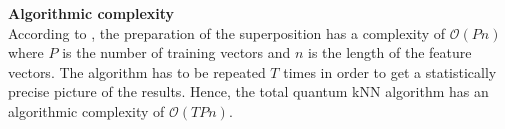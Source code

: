 \begin{redbox}
\textbf{Algorithmic complexity}\\
\newline
According to , the preparation of the superposition has a complexity of $\mathcal{O}(Pn)$ where $P$ is the number of training vectors and $n$ is the length of the feature vectors. The algorithm has to be repeated $T$ times in order to get a statistically precise picture of the results. Hence, the total quantum kNN algorithm has an algorithmic complexity of $\mathcal{O}(TPn)$. 
\end{redbox}

